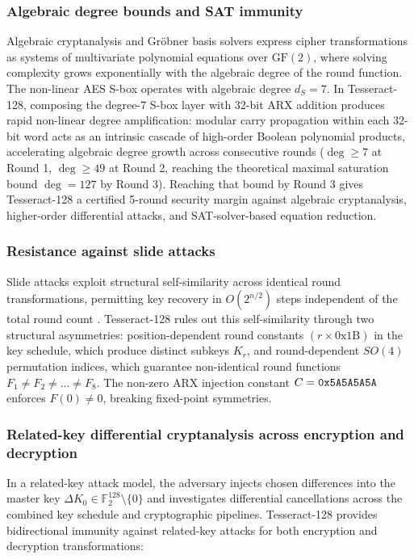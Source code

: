 \documentclass[review,12pt]{elsarticle}
\begin{document}
\subsubsection{Algebraic degree bounds and SAT immunity}
Algebraic cryptanalysis and Gr\"{o}bner basis solvers express cipher transformations as systems of multivariate polynomial equations over $\text{GF}(2)$, where solving complexity grows exponentially with the algebraic degree of the round function. The non-linear AES S-box operates with algebraic degree $d_S = 7$. In Tesseract-128, composing the degree-7 S-box layer with 32-bit ARX addition produces rapid non-linear degree amplification: modular carry propagation within each 32-bit word acts as an intrinsic cascade of high-order Boolean polynomial products, accelerating algebraic degree growth across consecutive rounds ($\deg \ge 7$ at Round 1, $\deg \ge 49$ at Round 2, reaching the theoretical maximal saturation bound $\deg = 127$ by Round 3). Reaching that bound by Round 3 gives Tesseract-128 a certified 5-round security margin against algebraic cryptanalysis, higher-order differential attacks, and SAT-solver-based equation reduction.

\subsubsection{Resistance against slide attacks}
Slide attacks exploit structural self-similarity across identical round transformations, permitting key recovery in $O(2^{n/2})$ steps independent of the total round count \cite{biryukov1999slide, biryukov2000slide}. Tesseract-128 rules out this self-similarity through two structural asymmetries: position-dependent round constants $(r \times \text{0x1B})$ in the key schedule, which produce distinct subkeys $K_r$, and round-dependent $SO(4)$ permutation indices, which guarantee non-identical round functions $F_1 \neq F_2 \neq \dots \neq {}\allowbreak F_8$. The non-zero ARX injection constant $C = \text{\texttt{0x5A5A5A5A}}$ enforces $F(0) \neq 0$, breaking fixed-point symmetries.

\subsubsection{Related-key differential cryptanalysis across encryption and decryption}
\label{subsec:related_key}
In a related-key attack model, the adversary injects chosen differences into the master key $\Delta K_0 \in \mathbb{F}_2^{128} \setminus \{0\}$ and investigates differential cancellations across the combined key schedule and cryptographic pipelines. Tesseract-128 provides bidirectional immunity against related-key attacks for both encryption and decryption transformations:
\end{document}
